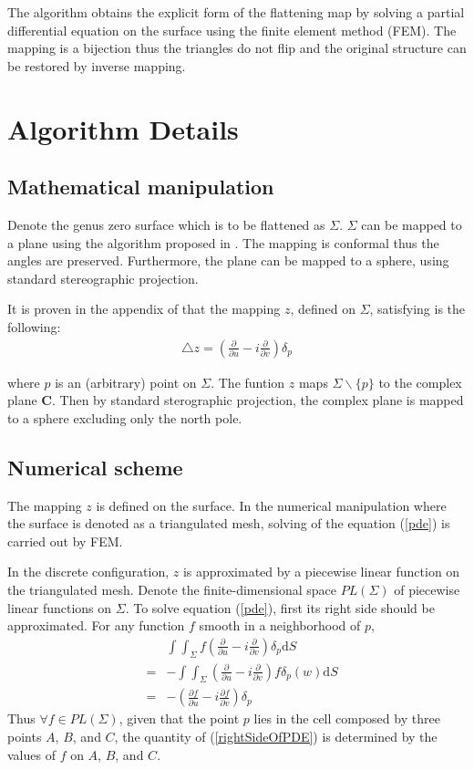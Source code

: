 \documentclass{InsightArticle}
\begin{document}
	The algorithm obtains the explicit form of the flattening map by
	solving a partial differential equation on the surface using the
	finite element method (FEM). The mapping is a bijection thus the 
	triangles do not flip and the original structure can be restored
	by inverse mapping.

	\section{Algorithm Details}

	\subsection{Mathematical manipulation}
  Denote the genus zero surface which is to be flattened as $\Sigma$.
  $\Sigma$ can be mapped to a plane using the algorithm proposed in
  \cite{angenent1999lbo}. The mapping is conformal thus the angles are
  preserved. Furthermore, the plane can be mapped to a sphere, using
  standard stereographic projection.
  
  It is proven in the appendix of \cite{angenent1999lbo} that the mapping
  $z$, defined on $\Sigma$, satisfying is the following:
  \begin{eqnarray}
    \triangle z = (\frac{\partial}{\partial u} - i\frac{\partial}{\partial v})\delta_p 
    \label{pde}
  \end{eqnarray}
  
  where $p$ is an (arbitrary) point on $\Sigma$. The funtion $z$ maps
  $\Sigma \backslash \{p\}$ to the complex plane $\mathbf{C}$. Then by
  standard sterographic projection, the complex plane is mapped to a
  sphere excluding only the north pole.

  \subsection{Numerical scheme}
  The mapping $z$ is defined on the surface. In the numerical
  manipulation where the surface is denoted as a triangulated mesh,
  solving of the equation (\ref{pde}) is carried out by FEM.
  
  In the discrete configuration, $z$ is approximated by a piecewise
  linear function on the triangulated mesh. Denote the
  finite-dimensional space $PL(\Sigma)$ of piecewise linear functions
  on $\Sigma$. To solve equation (\ref{pde}), first its right side
  should be approximated. For any function $f$ smooth in a
  neighborhood of $p$,
  \begin{eqnarray}
    && \int\int_{\Sigma} f (\frac{\partial}{\partial u} - i\frac{\partial}{\partial v})\delta_p \mathrm{d}S \nonumber \\
    &=& - \int\int_{\Sigma}(\frac{\partial}{\partial u} - i\frac{\partial}{\partial v})f \delta_p(w) \mathrm{d}S \nonumber \\
    &=& -(\frac{\partial f}{\partial u} - i\frac{\partial f}{\partial v})\delta_p \label{rightSideOfPDE}
  \end{eqnarray}  
  Thus $\forall f \in PL(\Sigma)$, given that the point $p$ lies in
  the cell composed by three points $A$, $B$, and $C$, the quantity of
  (\ref{rightSideOfPDE}) is determined by the values of $f$ on $A$,
  $B$, and $C$.
  
\end{document}
